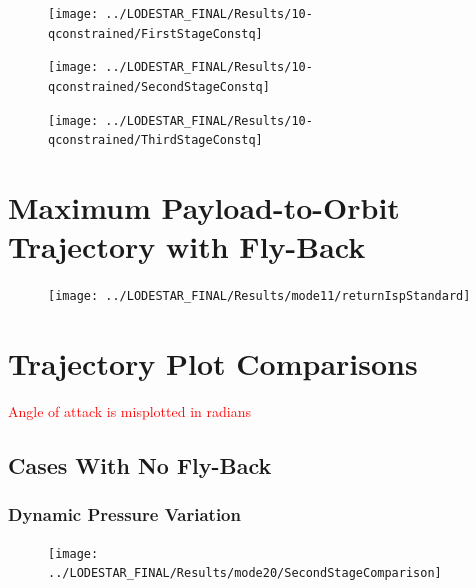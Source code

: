 \begin{figure}[th]
\centering
\texttt{[image: ../LODESTAR\_FINAL/Results/10-qconstrained/FirstStageConstq]}
\caption{}
\label{fig:FirstStageqConstrained68}
\end{figure}
		
\begin{figure}[th]
\centering
\texttt{[image: ../LODESTAR\_FINAL/Results/10-qconstrained/SecondStageConstq]}
\caption{}
\label{fig:SecondStageqConstrained68}
\end{figure}

\begin{figure}[th]
\centering
\texttt{[image: ../LODESTAR\_FINAL/Results/10-qconstrained/ThirdStageConstq]}
\caption{}
\label{fig:ThirdStageqConstrained68}
\end{figure}

\chapter{Maximum Payload-to-Orbit Trajectory with Fly-Back}\label{appendix:flyback}

\begin{figure}
\centering
\texttt{[image: ../LODESTAR\_FINAL/Results/mode11/returnIspStandard]}
\caption{}
\label{fig:returnIspStandard}
\end{figure}

		
		\chapter{Trajectory Plot Comparisons}\label{sec:Appendix_trajectorycomparisons}
		
		\textcolor{red}{Angle of attack is misplotted in radians}
		
		\section{Cases With No Fly-Back}
		
		\subsection{Dynamic Pressure Variation}\label{sec:app_comparison20}
		
		
\begin{figure}[!ht]
\centering
\texttt{[image: ../LODESTAR\_FINAL/Results/mode20/SecondStageComparison]}
\caption{}
\label{fig:SecondStageComparison1}
\end{figure}

